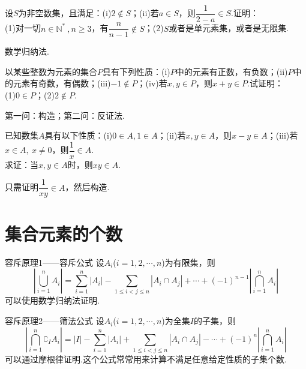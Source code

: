 \documentclass[lang=cn, zihao=4.5]{elegantbook}
\begin{document}
\begin{example} %
	设$S$为非空数集，且满足：(i)$2 \notin S$；(ii)若$a \in S$，则$\dfrac{1}{2-a} \in S$.证明： \\
	(1)对一切$n \in \mathbb{N} ^{*} ~, n \geq 3$，有$\dfrac{n}{n-1} \notin S$；(2)$S$或者是单元素集，或者是无限集.
\end{example}
\begin{hint}
	数学归纳法.
\end{hint}

\begin{example} %
	以某些整数为元素的集合$P$具有下列性质：(i)$P$中的元素有正数，有负数；(ii)$P$中的元素有奇数，有偶数；(iii)$-1 \notin P$；(iv)若$x,y \in P$，则$x+y \in P$.试证明： \\
	(1)$0 \in P$；(2)$2 \notin P$.
\end{example}
\begin{hint}
	第一问：构造；第二问：反证法.
\end{hint}

\begin{example} %
	已知数集$A$具有以下性质：(i)$0 \in A,1 \in A$；(ii)若$x,y \in A$，则$x-y \in A$；(iii)若$x \in A, ~x \neq 0$，则$\dfrac{1}{x} \in A$. \\
	求证：当$x,y \in A$时，则$xy \in A$.
\end{example}
\begin{hint}
	只需证明$\dfrac{1}{xy} \in A$，然后构造.
\end{hint}

\newpage
\section{集合元素的个数}

\begin{theorem}{容斥原理1——容斥公式}
	设$A_i$($i=1,2, \cdots ,n$)为有限集，则
	$$|\bigcup_{i=1}^{n} A_i| = \sum_{i=1}^{n} |A_i|-\sum_{1 \leq i < j \leq n}|A_i \cap A_j| + \cdots + (-1)^{n-1} |\bigcap_{i=1}^{n} A_i|$$
	可以使用数学归纳法证明.
\end{theorem}

\begin{theorem}{容斥原理2——筛法公式}
	设$A_i$($i=1,2, \cdots ,n$)为全集$I$的子集，则
	$$|\bigcap_{i=1}^{n} \complement _{I} A_i| = |I| - \sum_{i=1}^{n} |A_i|+\sum_{1 \leq i < j \leq n}|A_i \cap A_j| - \cdots + (-1)^{n} |\bigcap_{i=1}^{n} A_i|$$
	可以通过摩根律证明.这个公式常常用来计算不满足任意给定性质的子集个数.
\end{theorem}
\end{document}
